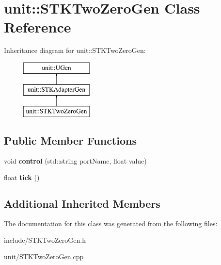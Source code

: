 \hypertarget{classunit_1_1STKTwoZeroGen}{}\section{unit\+:\+:S\+T\+K\+Two\+Zero\+Gen Class Reference}
\label{classunit_1_1STKTwoZeroGen}
Inheritance diagram for unit\+:\+:S\+T\+K\+Two\+Zero\+Gen\+:\begin{figure}[H]
\begin{center}
\leavevmode
\includegraphics[height=3.000000cm]{classunit_1_1STKTwoZeroGen}
\end{center}
\end{figure}
\subsection*{Public Member Functions}
\begin{DoxyCompactItemize}
\item 
void {\bfseries control} (std\+::string port\+Name, float value)\hypertarget{classunit_1_1STKTwoZeroGen_a35f0458e31142985a3f35b603ff90e62}{}\label{classunit_1_1STKTwoZeroGen_a35f0458e31142985a3f35b603ff90e62}

\item 
float {\bfseries tick} ()\hypertarget{classunit_1_1STKTwoZeroGen_a1e9392a2e8dc67862de802e914acbf33}{}\label{classunit_1_1STKTwoZeroGen_a1e9392a2e8dc67862de802e914acbf33}

\end{DoxyCompactItemize}
\subsection*{Additional Inherited Members}


The documentation for this class was generated from the following files\+:\begin{DoxyCompactItemize}
\item 
include/S\+T\+K\+Two\+Zero\+Gen.\+h\item 
unit/S\+T\+K\+Two\+Zero\+Gen.\+cpp\end{DoxyCompactItemize}
